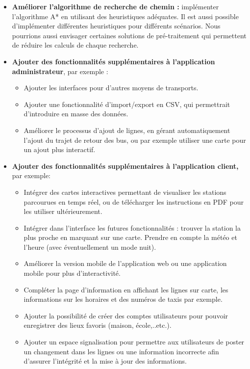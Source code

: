 \begin{itemize}
	\item \textbf{Améliorer l'algorithme de recherche de chemin :}  implémenter l'algorithme A* en utilisant des heuristiques adéquates. Il est aussi possible d'implémenter différentes heuristiques pour différents scénarios.\newline
	Nous pourrions aussi envisager certaines solutions de pré-traitement qui permettent de réduire les calculs de chaque recherche.
	\item \textbf{Ajouter des fonctionnalités supplémentaires à l'application administrateur}, par exemple :
		\begin{itemize}
			\item Ajouter les interfaces pour d'autres moyens de transports.
			\item Ajouter une fonctionnalité d'import/export en \acrshort{CSV}, qui permettrait d'introduire en masse des données.
			\item Améliorer le processus d'ajout de lignes, en gérant automatiquement l'ajout du trajet de retour des bus, ou par exemple utiliser une carte pour un ajout plus interactif.
		\end{itemize}
	\item \textbf{Ajouter des fonctionnalités supplémentaires à l'application client,} par exemple:
		\begin{itemize}
			\item Intégrer des cartes interactives permettant de visualiser les stations parcourues en temps réel, ou de télécharger les instructions en PDF pour les utiliser ultérieurement.
			\item Intégrer dans l'interface les futures fonctionnalités : trouver la station la plus proche en marquant sur une carte. Prendre en compte la météo et l'heure (avec éventuellement un mode nuit).
			\item Améliorer la version mobile de l'application web ou une application mobile pour plus d'interactivité.
			\item Compléter la page d'information en affichant les lignes sur carte, les informations sur les horaires et des numéros de taxis par exemple.
			\item Ajouter la possibilité de créer des comptes utilisateurs pour pouvoir enregistrer des lieux favoris (maison, école,..etc.).
			\item Ajouter un espace signalisation pour permettre aux utilisateurs de poster un changement dans les lignes ou une information incorrecte afin d'assurer l'intégrité et la mise à jour des informations.
		\end{itemize}
\end{itemize}